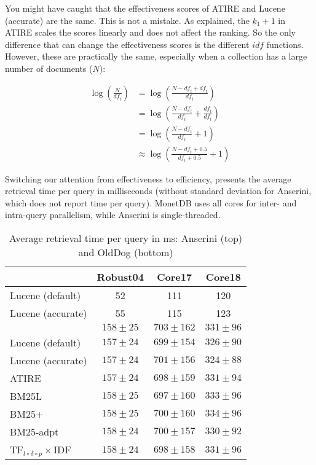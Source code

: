 You might have caught that the effectiveness scores of ATIRE and Lucene (accurate) are the same. This is not a mistake. As explained, the $k_1+1$ in ATIRE scales the scores linearly and does not affect the ranking. So the only difference that can change the effectiveness scores is the different $\mathit{idf}$ functions. However, these are practically the same, especially when a collection has a large number of documents ($N$):

\label{diff-idf}
\begin{align}
	\log\left(\frac{N}{\mathit{df}_t}\right) &= \log\left(\frac{N-\mathit{df}_t+\mathit{df}_t}{\mathit{df}_t}\right) \\
	&= \log\left(\frac{N-\mathit{df}_t}{\mathit{df}_t} + \frac{\mathit{df}_t}{\mathit{df}_t}\right) \\
	&= \log\left(\frac{N-\mathit{df}_t}{\mathit{df}_t} + 1\right) \\
	&\approx \log\left(\frac{N-\mathit{df}_t+0.5}{\mathit{df}_t+0.5} + 1\right)
\end{align}

Switching our attention from effectiveness to efficiency,
 presents the average retrieval time per query in milliseconds (without standard deviation for Anserini, which does not report time per query). MonetDB uses all cores for inter- and intra-query parallelism, while Anserini is single-threaded.

\begin{table}
	\centering
	\caption{Average retrieval time per query in ms: Anserini (top) and OldDog (bottom)}
	\label{bm25_effiency}
	\begin{tabular}{l | c c c}
		\toprule
		&Robust04&Core17&Core18\\
		\midrule
		Lucene (default)&52&111&120\\
		Lucene (accurate)&55&115&123\\
		\midrule
		\citeauthor{bm25-robertson}&$158\pm25$&$703\pm162$&$331\pm96$\\
		Lucene (default)&$157\pm24$&$699\pm154$&$326\pm90$\\
		Lucene (accurate)&$157\pm24$&$701\pm156$&$324\pm88$\\
		ATIRE&$157\pm24$&$698\pm159$&$331\pm94$\\
		BM25L&$158\pm25$&$697\pm160$&$333\pm96$\\
		BM25+&$158\pm25$&$700\pm160$&$334\pm96$\\
		BM25-adpt&$158\pm24$&$700\pm157$&$330\pm92$\\
		TF$_{l\circ\delta\circ p}\times$IDF&$158\pm24$&$698\pm158$&$331\pm96$ \\
		\bottomrule
	\end{tabular}
\end{table}

